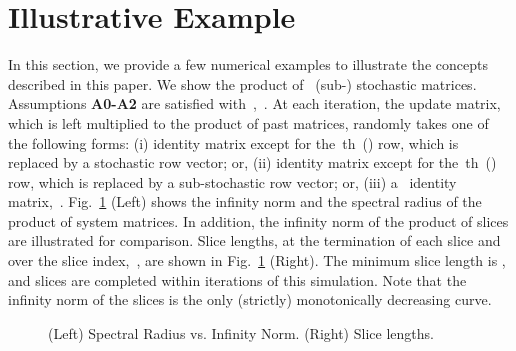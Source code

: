 \documentclass[draftclsnofoot, onecolumn, 12pt]{IEEEtran}
\begin{document}
\section{Illustrative Example}\label{example}
In this section, we provide a few numerical examples to illustrate the concepts described in this paper. We show the product of~ (sub-) stochastic matrices. Assumptions {\bf{A0-A2}} are satisfied with~,~. At each iteration, the update matrix, which is left multiplied to the product of past matrices, randomly takes one of the following forms: 
(i) identity matrix except for the~th~() row, which is replaced by a stochastic row vector; or,
(ii) identity matrix except for the~th~() row, which is replaced by a sub-stochastic row vector; or, 
(iii) a~ identity matrix,~. 
Fig.~\ref{f2} (Left) shows the infinity norm and the spectral radius of the product of system matrices. In addition, the infinity norm of the product of slices are illustrated for comparison. Slice lengths, at the termination of each slice and over the slice index,~, are shown in Fig.~\ref{f2} (Right). The minimum slice length is , and  slices are completed within  iterations of this simulation. Note that the infinity norm of the slices is the only (strictly) monotonically decreasing curve. 
\begin{figure}[!h]
\centering
{}
\caption{(Left) Spectral Radius vs. Infinity Norm. (Right) Slice lengths.}
\label{f2}
\end{figure}
\end{document}
